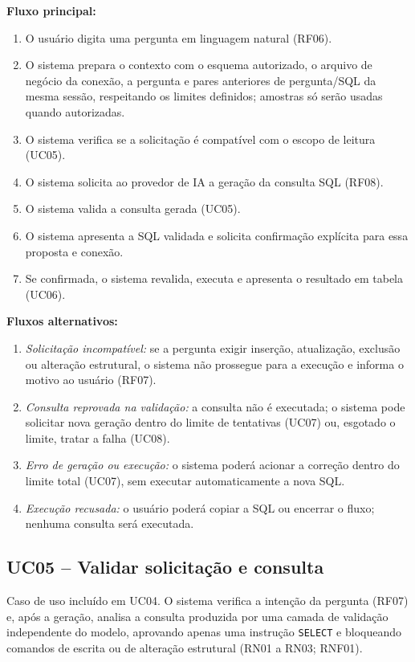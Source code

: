 \begin{apendicesenv}
\textbf{Fluxo principal:}
\begin{enumerate}
    \item O usuário digita uma pergunta em linguagem natural (RF06).
    \item O sistema prepara o contexto com o esquema autorizado, o arquivo de negócio da conexão, a pergunta e pares anteriores de pergunta/SQL da mesma sessão, respeitando os limites definidos; amostras só serão usadas quando autorizadas.
    \item O sistema verifica se a solicitação é compatível com o escopo de leitura (UC05).
    \item O sistema solicita ao provedor de IA a geração da consulta SQL (RF08).
    \item O sistema valida a consulta gerada (UC05).
    \item O sistema apresenta a SQL validada e solicita confirmação explícita para essa proposta e conexão.
    \item Se confirmada, o sistema revalida, executa e apresenta o resultado em tabela (UC06).
\end{enumerate}

\textbf{Fluxos alternativos:}
\begin{enumerate}
    \item[A1.] \emph{Solicitação incompatível:} se a pergunta exigir inserção, atualização, exclusão ou alteração estrutural, o sistema não prossegue para a execução e informa o motivo ao usuário (RF07).
    \item[A2.] \emph{Consulta reprovada na validação:} a consulta não é executada; o sistema pode solicitar nova geração dentro do limite de tentativas (UC07) ou, esgotado o limite, tratar a falha (UC08).
    \item[A3.] \emph{Erro de geração ou execução:} o sistema poderá acionar a correção dentro do limite total (UC07), sem executar automaticamente a nova SQL.
    \item[A4.] \emph{Execução recusada:} o usuário poderá copiar a SQL ou encerrar o fluxo; nenhuma consulta será executada.
\end{enumerate}

\subsection{UC05 -- Validar solicitação e consulta}

Caso de uso incluído em UC04. O sistema verifica a intenção da pergunta (RF07) e, após a geração, analisa a consulta produzida por uma camada de validação independente do modelo, aprovando apenas uma instrução \texttt{SELECT} e bloqueando comandos de escrita ou de alteração estrutural (RN01 a RN03; RNF01).


\end{apendicesenv}
